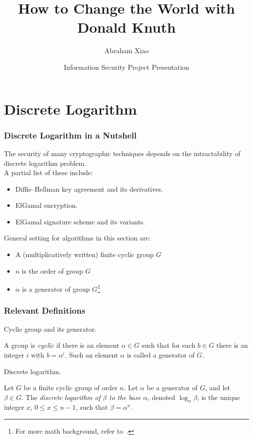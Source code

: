\documentclass[hyperref=true]{beamer}
\begin{document}
\title[Change the World]{How to Change the World with Donald Knuth}
\author{Abraham Xiao}
\date[CIS612 Presentation]{Information Security Project Presentation}



\begin{frame}
  \titlepage{}
\end{frame}

\begin{frame}
  \tableofcontents{}
\end{frame}

\section{Discrete Logarithm}
\label{sec:discrete-logarithm}



\begin{frame}
  \frametitle{Discrete Logarithm in a Nutshell}
The security of many cryptographic techniques depends on the
intractability of discrete logarithm problem.\\[4pt]A partial list of these
include:
\begin{itemize}
\item Diffie–Hellman key agreement and its derivatives.
\item ElGamal encryption.
\item ElGamal signature scheme and its variants.
\end{itemize}
General setting for algorithms in this section are:
\begin{itemize}
\item A (multiplicatively written) finite cyclic group $G$
\item $n$ is the order of group $G$
\item $\alpha$ is a generator of group $G$\footnote{For more math
    background, refer to~\cite{Rosen:2012}.}
\end{itemize}
\end{frame}

\begin{frame}
  \frametitle{Relevant Definitions}
Cyclic group and its generator.
  \begin{definition}
    A group is \emph{cyclic} if there is an element $\alpha\in G$ such
    that for each $b\in G$ there is an integer $i$ with
    $b=\alpha^{i}$. Such an element $\alpha$ is called a generator of $G$.
  \end{definition}
Discrete logarithm.
  \begin{definition}
    Let $G$ be a finite cyclic group of order $n$. Let $\alpha$ be a
    generator of $G$, and let $\beta\in G$. The \emph{discrete
      logarithm of $\beta$ to the base $\alpha$}, denoted
    $\log_{\alpha}\beta$, is the unique integer $x$, $0\leq x\leq
    n-1$, such that $\beta=\alpha^{x}$\cite{Menezes:1996:HAC:548089}.
  \end{definition}
\end{frame}
\end{document}
